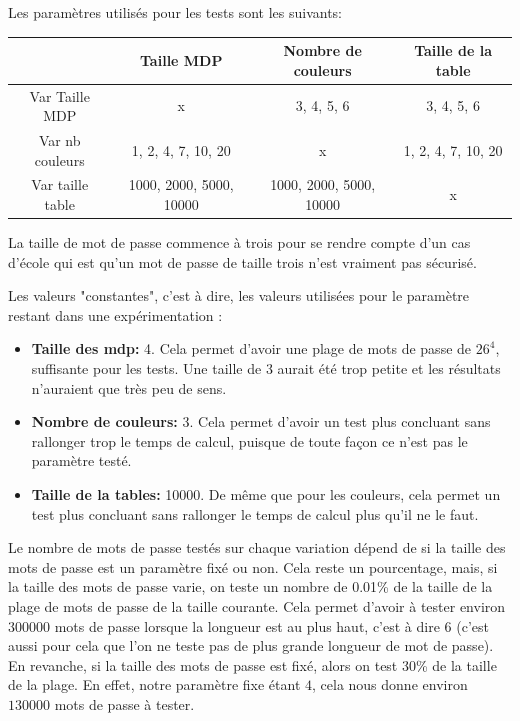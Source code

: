 \documentclass[french,12pt]{article}
\begin{document}
    Les paramètres utilisés pour les tests sont les suivants:
    
    \begin{tabular}{|c|c|c|c|}
        \hline
         & Taille MDP & Nombre de couleurs & Taille de la table  \\
         \hline
         Var Taille MDP & x & {3, 4, 5, 6} & {3, 4, 5, 6} \\
         \hline
         Var nb couleurs & {1, 2, 4, 7, 10, 20} & x & {1, 2, 4, 7, 10, 20} \\
         \hline
         Var taille table & {1000, 2000, 5000, 10000} & {1000, 2000, 5000, 10000} & x\\
         \hline
    \end{tabular}

    La taille de mot de passe commence à trois pour se rendre compte d'un cas d'école qui est qu'un mot de passe de taille trois n'est vraiment pas sécurisé.

    Les valeurs "constantes", c'est à dire, les valeurs utilisées pour le paramètre restant dans une expérimentation :
    \begin{itemize}
        \item \textbf{Taille des mdp:} 4. Cela permet d'avoir une plage de mots de passe de $26^4$, suffisante pour les tests. Une taille de 3 aurait été trop petite et les résultats n'auraient que très peu de sens.
        \item \textbf{Nombre de couleurs:} 3. Cela permet d'avoir un test plus concluant sans rallonger trop le temps de calcul, puisque de toute façon ce n'est pas le paramètre testé.
        \item \textbf{Taille de la tables:} 10000. De même que pour les couleurs, cela permet un test plus concluant sans rallonger le temps de calcul plus qu'il ne le faut.
    \end{itemize}

    Le nombre de mots de passe testés sur chaque variation dépend de si la taille des mots de passe est un paramètre fixé ou non. Cela reste un pourcentage, mais, si la taille des mots de passe varie, on teste un nombre de 0.01\% de la taille de la plage de mots de passe de la taille courante. Cela permet d'avoir à tester environ $300000$ mots de passe lorsque la longueur est au plus haut, c'est à dire 6 (c'est aussi pour cela que l'on ne teste pas de plus grande longueur de mot de passe). En revanche, si la taille des mots de passe est fixé, alors on test 30\% de la taille de la plage. En effet, notre paramètre fixe étant $4$, cela nous donne environ $130000$ mots de passe à tester.
    
\end{document}
